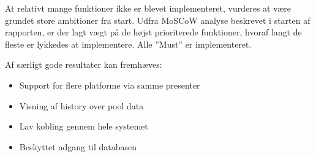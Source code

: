 At relativt mange funktioner ikke er blevet implementeret, vurderes at være grundet store ambitioner fra start. Udfra MoSCoW analyse beskrevet i starten af rapporten, er der lagt vægt på de højst prioriterede funktioner, hvoraf langt de fleste er lykkedes at implementere. Alle ''Must'' er implementeret.

Af særligt gode resultater kan fremhæves:

\begin{itemize}
	\item Support for flere platforme via samme presenter
	\item Visning af history over pool data
	\item Lav kobling gennem hele systemet
	\item Beskyttet adgang til databasen
\end{itemize}